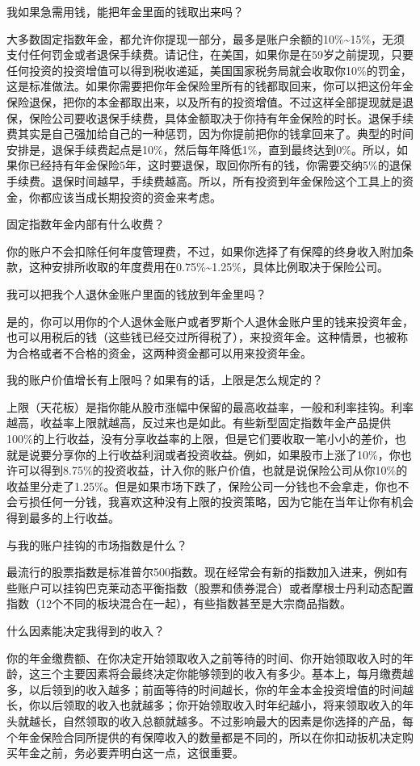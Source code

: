 我如果急需用钱，能把年金里面的钱取出来吗？

大多数固定指数年金，都允许你提现一部分，最多是账户余额的10\%\textasciitilde{}15\%，无须支付任何罚金或者退保手续费。请记住，在美国，如果你是在59岁之前提现，只要任何投资的投资增值可以得到税收递延，美国国家税务局就会收取你10\%的罚金，这是标准做法。如果你需要把你年金保险里所有的钱都取回来，你可以把这份年金保险退保，把你的本金都取出来，以及所有的投资增值。不过这样全部提现就是退保，保险公司要收退保手续费，具体金额取决于你持有年金保险的时长。退保手续费其实是自己强加给自己的一种惩罚，因为你提前把你的钱拿回来了。典型的时间安排是，退保手续费起点是10\%，然后每年降低1\%，直到最终达到0\%。所以，如果你已经持有年金保险5年，这时要退保，取回你所有的钱，你需要交纳5\%的退保手续费。退保时间越早，手续费越高。所以，所有投资到年金保险这个工具上的资金，你都应该当成长期投资的资金来考虑。

固定指数年金内部有什么收费？

你的账户不会扣除任何年度管理费，不过，如果你选择了有保障的终身收入附加条款，这种安排所收取的年度费用在0.75\%\textasciitilde{}1.25\%，具体比例取决于保险公司。

我可以把我个人退休金账户里面的钱放到年金里吗？

是的，你可以用你的个人退休金账户或者罗斯个人退休金账户里的钱来投资年金，也可以用税后的钱（这些钱已经交过所得税了），来投资年金。这种情景，也被称为合格或者不合格的资金，这两种资金都可以用来投资年金。

我的账户价值增长有上限吗？如果有的话，上限是怎么规定的？

上限（天花板）是指你能从股市涨幅中保留的最高收益率，一般和利率挂钩。利率越高，收益率上限就越高，反过来也是如此。有些新型固定指数年金产品提供100\%的上行收益，没有分享收益率的上限，但是它们要收取一笔小小的差价，也就是说要分享你的上行收益利润或者投资收益。例如，如果股市上涨了10\%，你也许可以得到8.75\%的投资收益，计入你的账户价值，也就是说保险公司从你10\%的收益里分走了1.25\%。但是如果市场下跌了，保险公司一分钱也不会拿走，你也不会亏损任何一分钱，我喜欢这种没有上限的投资策略，因为它能在当年让你有机会得到最多的上行收益。

与我的账户挂钩的市场指数是什么？

最流行的股票指数是标准普尔500指数。现在经常会有新的指数加入进来，例如有些账户可以挂钩巴克莱动态平衡指数（股票和债券混合）或者摩根士丹利动态配置指数（12个不同的板块混合在一起），有些指数甚至是大宗商品指数。

什么因素能决定我得到的收入？

你的年金缴费额、在你决定开始领取收入之前等待的时间、你开始领取收入时的年龄，这三个主要因素将会最终决定你能够领到的收入有多少。基本上，每月缴费越多，以后领到的收入越多；前面等待的时间越长，你的年金本金投资增值的时间越长，你以后领取的收入也就越多；你开始领取收入时年纪越小，将来领取收入的年头就越长，自然领取的收入总额就越多。不过影响最大的因素是你选择的产品，每个年金保险合同所提供的有保障收入的数量都是不同的，所以在你扣动扳机决定购买年金之前，务必要弄明白这一点，这很重要。

